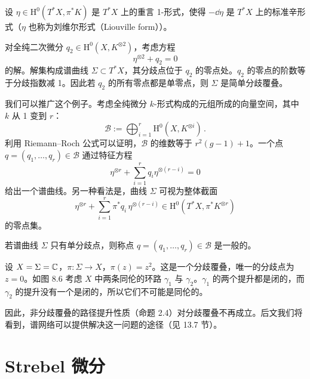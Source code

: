 设 $\eta\in\mathrm{H}^0(T^*X,\pi^*K)$ 是 $T^*X$ 上的重言 1-形式，使得 $-\dd\eta$ 是 $T^*X$ 上的标准辛形式（$\eta$ 也称为刘维尔形式（Liouville form））。

\begin{example}[8.12] 对全纯二次微分 $q_2\in\mathrm{H}^0(X,K^{\otimes 2})$，考虑方程
\[
\eta^{\otimes 2}+q_2=0
\]
的解。解集构成谱曲线 $\Sigma\subset T^*X$，其分歧点位于 $q_2$ 的零点处。$q_2$ 的零点的阶数等于分歧指数减 1。因此若 $q_2$ 的所有零点都是单零点，则 $\Sigma$ 是简单分歧覆叠。\end{example}


我们可以推广这个例子。考虑全纯微分 $k$-形式构成的元组所成的向量空间，其中 $k$ 从 1 变到 $r$：
\[
\mathcal{B}:=\bigoplus_{i=1}^{r}\mathrm{H}^0(X,K^{\otimes i})\,.
\]
利用 Riemann–Roch 公式可以证明，$\mathcal{B}$ 的维数等于 $r^2(g-1)+1$。一个点 $q=(q_1,\dots,q_r)\in\mathcal{B}$ 通过特征方程
\[
\eta^{\otimes r}+\sum_{i=1}^{r}q_i\eta^{\otimes(r-i)}=0
\]
给出一个谱曲线。另一种看法是，曲线 $\Sigma$ 可视为整体截面
\[
\eta^{\otimes r}+\sum_{i=1}^{r}\pi^*q_i\,\eta^{\otimes(r-i)}\in\mathrm{H}^0(T^*X,\pi^*K^{\otimes r})
\]
的零点集。

若谱曲线 $\Sigma$ 只有单分歧点，则称点 $q=(q_1,\dots,q_r)\in\mathcal{B}$ 是一般的。

\begin{remark}[8.13] 设 $X=\Sigma=\mathbb{C}$，$\pi:\Sigma\to X$，$\pi(z)=z^2$。这是一个分歧覆叠，唯一的分歧点为 $z=0$。如图 8.6 考虑 $X$ 中两条同伦的环路 $\gamma_1$ 与 $\gamma_2$。$\gamma_1$ 的两个提升都是闭的，而 $\gamma_2$ 的提升没有一个是闭的，所以它们不可能是同伦的。\end{remark}

因此，非分歧覆叠的路径提升性质（命题 2.4）对分歧覆叠不再成立。后文我们将看到，谱网络可以提供解决这一问题的途径（见 13.7 节）。


\section{Strebel 微分}

